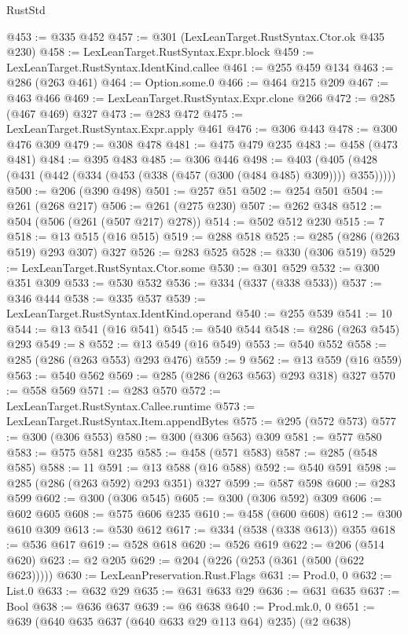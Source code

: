 \begin{lexlean}{RustStd}
\begin{coremodule}
@453 := @335 @452
@457 := @301 (LexLeanTarget.RustSyntax.Ctor.ok @435 @230)
@458 := LexLeanTarget.RustSyntax.Expr.block
@459 := LexLeanTarget.RustSyntax.IdentKind.callee
@461 := @255 @459 @134
@463 := @286 (@263 @461)
@464 := Option.some.{0}
@466 := @464 @215 @209
@467 := @463 @466
@469 := LexLeanTarget.RustSyntax.Expr.clone @266
@472 := @285 (@467 @469) @327
@473 := @283 @472
@475 := LexLeanTarget.RustSyntax.Expr.apply @461
@476 := @306 @443
@478 := @300 @476 @309
@479 := @308 @478
@481 := @475 @479 @235
@483 := @458 (@473 @481)
@484 := @395 @483
@485 := @306 @446
@498 := @403 (@405 (@428 (@431 (@442 (@334 (@453 (@338 (@457 (@300 (@484 @485) @309)))) @355)))))
@500 := @206 (@390 @498)
@501 := @257 @51
@502 := @254 @501
@504 := @261 (@268 @217)
@506 := @261 (@275 @230)
@507 := @262 @348
@512 := @504 (@506 (@261 (@507 @217) @278))
@514 := @502 @512 @230
@515 := 7
@518 := @13 @515 (@16 @515)
@519 := @288 @518
@525 := @285 (@286 (@263 @519) @293 @307) @327
@526 := @283 @525
@528 := @330 (@306 @519)
@529 := LexLeanTarget.RustSyntax.Ctor.some
@530 := @301 @529
@532 := @300 @351 @309
@533 := @530 @532
@536 := @334 (@337 (@338 @533))
@537 := @346 @444
@538 := @335 @537
@539 := LexLeanTarget.RustSyntax.IdentKind.operand
@540 := @255 @539
@541 := 10
@544 := @13 @541 (@16 @541)
@545 := @540 @544
@548 := @286 (@263 @545) @293
@549 := 8
@552 := @13 @549 (@16 @549)
@553 := @540 @552
@558 := @285 (@286 (@263 @553) @293 @476)
@559 := 9
@562 := @13 @559 (@16 @559)
@563 := @540 @562
@569 := @285 (@286 (@263 @563) @293 @318) @327
@570 := @558 @569
@571 := @283 @570
@572 := LexLeanTarget.RustSyntax.Callee.runtime
@573 := LexLeanTarget.RustSyntax.Item.appendBytes
@575 := @295 (@572 @573)
@577 := @300 (@306 @553)
@580 := @300 (@306 @563) @309
@581 := @577 @580
@583 := @575 @581 @235
@585 := @458 (@571 @583)
@587 := @285 (@548 @585)
@588 := 11
@591 := @13 @588 (@16 @588)
@592 := @540 @591
@598 := @285 (@286 (@263 @592) @293 @351) @327
@599 := @587 @598
@600 := @283 @599
@602 := @300 (@306 @545)
@605 := @300 (@306 @592) @309
@606 := @602 @605
@608 := @575 @606 @235
@610 := @458 (@600 @608)
@612 := @300 @610 @309
@613 := @530 @612
@617 := @334 (@538 (@338 @613)) @355
@618 := @536 @617
@619 := @528 @618
@620 := @526 @619
@622 := @206 (@514 @620)
@623 := @2 @205
@629 := @204 (@226 (@253 (@361 (@500 (@622 @623)))))
@630 := LexLeanPreservation.Rust.Flags
@631 := Prod.{0, 0}
@632 := List.{0}
@633 := @632 @29
@635 := @631 @633 @29
@636 := @631 @635
@637 := Bool
@638 := @636 @637
@639 := @6 @638
@640 := Prod.mk.{0, 0}
@651 := @639 (@640 @635 @637 (@640 @633 @29 @113 @64) @235) (@2 @638)

\end{coremodule}
\end{lexlean}
